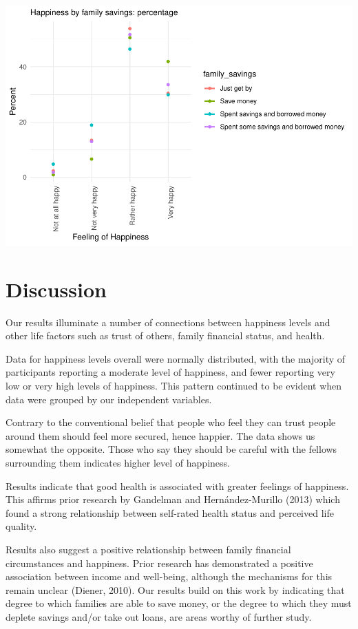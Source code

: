\documentclass[man, fleqn, noextraspace,floatsintext]{apa6}
\begin{document}
\includegraphics{610_final_files/figure-latex/happiness by family savings tables and figures-1.pdf}

\hypertarget{discussion}{%
\section{Discussion}\label{discussion}}

Our results illuminate a number of connections between happiness levels and other life factors such as trust of others, family financial status, and health.

Data for happiness levels overall were normally distributed, with the majority of participants reporting a moderate level of happiness, and fewer reporting very low or very high levels of happiness. This pattern continued to be evident when data were grouped by our independent variables.

Contrary to the conventional belief that people who feel they can trust people around them should feel more secured, hence happier. The data shows us somewhat the opposite. Those who say they should be careful with the fellows surrounding them indicates higher level of happiness.

Results indicate that good health is associated with greater feelings of happiness. This affirms prior research by Gandelman and Hernández-Murillo (2013) which found a strong relationship between self-rated health status and perceived life quality.

Results also suggest a positive relationship between family financial circumstances and happiness. Prior research has demonstrated a positive association between income and well-being, although the mechanisms for this remain unclear (Diener, 2010). Our results build on this work by indicating that degree to which families are able to save money, or the degree to which they must deplete savings and/or take out loans, are areas worthy of further study.
\end{document}
